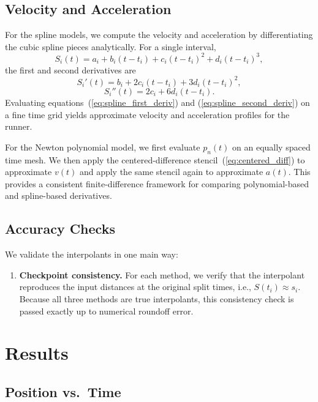 \documentclass[12pt]{article}
\begin{document}
\subsection{Velocity and Acceleration}

For the spline models, we compute the velocity and acceleration by
differentiating the cubic spline pieces analytically. For a single
interval,
\[
  S_i(t) = a_i + b_i (t - t_i) + c_i (t - t_i)^2 + d_i (t - t_i)^3,
\]
the first and second derivatives are
\begin{equation}
  S_i'(t) = b_i + 2 c_i (t - t_i) + 3 d_i (t - t_i)^2,
  \label{eq:spline_first_deriv}
\end{equation}
\begin{equation}
  S_i''(t) = 2 c_i + 6 d_i (t - t_i).
  \label{eq:spline_second_deriv}
\end{equation}
Evaluating equations~(\ref{eq:spline_first_deriv}) and
(\ref{eq:spline_second_deriv}) on a fine time grid yields approximate
velocity and acceleration profiles for the runner.

For the Newton polynomial model, we first evaluate $p_n(t)$ on an
equally spaced time mesh. We then apply the centered-difference
stencil~(\ref{eq:centered_diff}) to approximate $v(t)$ and apply the
same stencil again to approximate $a(t)$. This provides a consistent
finite-difference framework for comparing polynomial-based and
spline-based derivatives.

\subsection{Accuracy Checks}

We validate the interpolants in one main way:
\begin{enumerate}
\item \textbf{Checkpoint consistency.} For each method, we verify that
      the interpolant reproduces the input distances at the original
      split times, i.e., $S(t_i) \approx s_i$. Because all three methods
      are true interpolants, this consistency check is passed exactly up
      to numerical roundoff error.
\end{enumerate}

\section{Results}

\subsection{Position vs.\ Time}
\end{document}
